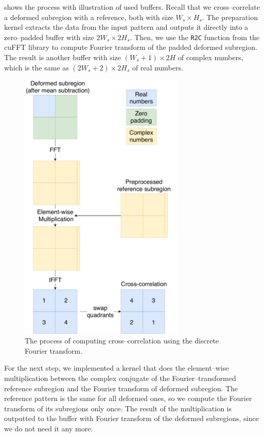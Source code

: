  shows the process with illustration of used buffers. Recall that we cross--correlate a deformed subregion with a reference, both with size $W_s \times H_s$. The preparation kernel extracts the data from the input pattern and outputs it directly into a zero--padded buffer with size $2W_s \times 2H_s$. Then, we use the \texttt{R2C} function from the cuFFT library to compute Fourier transform of the padded deformed subregion. The result is another buffer with size $(W_s + 1) \times 2H$ of complex numbers, which is the same as $(2W_s+2) \times 2H_s$ of real numbers.

\begin{figure}
	\centering
	\includegraphics[width=0.7\textwidth]{img/fft-impl}
	\caption{The process of computing cross--correlation using the discrete Fourier transform.}
	\label{fft-impl}
\end{figure}

For the next step, we implemented a kernel that does the element--wise multiplication between the complex conjugate of the Fourier--transformed reference subregion and the Fourier transform of deformed subregion. The reference pattern is the same for all deformed ones, so we compute the Fourier transform of its subregions only once. The result of the multiplication is outputted to the buffer with Fourier transform of the deformed subregions, since we do not need it any more.

